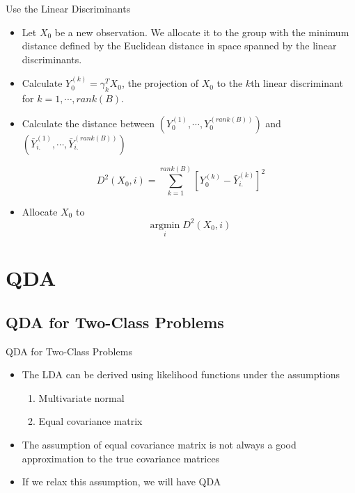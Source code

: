 \documentclass[
  ignorenonframetext,
]{beamer}
\providecommand{\tightlist}{%
  \setlength{\itemsep}{0pt}\setlength{\parskip}{0pt}}
\begin{document}
\begin{frame}{Use the Linear Discriminants}
\protect\hypertarget{use-the-linear-discriminants}{}
\begin{itemize}
\item
  Let \(X_0\) be a new observation. We allocate it to the group with the
  minimum distance defined by the Euclidean distance in space spanned by
  the linear discriminants.
\item
  Calculate \(Y_0^{(k)}=\gamma_k^T X_0\), the projection of \(X_0\) to
  the \(k\)th linear discriminant for \(k=1, \cdots, rank(B)\).
\item
  Calculate the distance between
  \((Y_0^{(1)}, \cdots, Y_0^{(rank(B))})\) and
  \((\bar Y_{i.}^{(1)}, \cdots, \bar Y_{i.}^{(rank(B))})\)
\end{itemize}

\[D^2(X_0, i) = \sum_{k=1}^{rank(B)} [Y_0^{(k)} - \bar Y_{i.}^{(k)}]^2\]

\begin{itemize}
\tightlist
\item
  Allocate \(X_0\) to \[\operatorname*{argmin}_i D^2(X_0, i)\]
\end{itemize}
\end{frame}

\hypertarget{qda}{%
\section{QDA}\label{qda}}

\hypertarget{qda-for-two-class-problems}{%
\subsection{QDA for Two-Class
Problems}\label{qda-for-two-class-problems}}

\begin{frame}{QDA for Two-Class Problems}
\begin{itemize}
\tightlist
\item
  The LDA can be derived using likelihood functions under the
  assumptions

  \begin{enumerate}
  \tightlist
  \item
    Multivariate normal
  \item
    Equal covariance matrix
  \end{enumerate}
\item
  The assumption of equal covariance matrix is not always a good
  approximation to the true covariance matrices
\item
  If we relax this assumption, we will have QDA
\end{itemize}
\end{frame}
\end{document}
